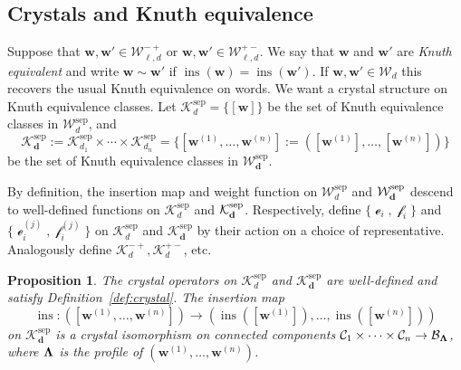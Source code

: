 \documentclass[12pt]{amsart}
\renewcommand{\d}{\mathbf{d}}
\newcommand{\bs}{\boldsymbol}
\DeclareMathOperator{\worde}{{\mathcal e}}
\DeclareMathOperator{\wordf}{{\mathcal f}}
\DeclareMathOperator{\ins}{\operatorname{ins}}
\newtheorem{proposition}[theorem]{Proposition}
\theoremstyle{definition}
\theoremstyle{remark}
\begin{document}
\subsection{Crystals and Knuth equivalence}
Suppose that ${\bs w},{\bs w}' \in {\mathcal W}_{\ell,d}^{-+}$ or ${\bs w},{\bs w}' \in {\mathcal W}_{\ell,d}^{+-}$. We say that 
${\bs w}$ and ${\bs w}'$ are \emph{Knuth equivalent} and write $\bs{w}\sim\bs{w}'$ if $\ins({\bs w}) = \ins({\bs w}')$. 
If ${\bs w},{\bs w}'\in {\mathcal W}_d$ this recovers the usual Knuth equivalence on words.
We want a crystal structure on Knuth equivalence classes. Let 
$\mathcal{K}_d^{\operatorname{sep}}=\{[\bs{w}]\}$ 
be the set of Knuth equivalence classes in $\mathcal{W}_d^{\operatorname{sep}}$, and 
\[\mathcal{K}_{\d}^{\operatorname{sep}} := \mathcal{K}_{d_1}^{\operatorname{sep}}\times\cdots\times 
\mathcal{K}_{d_n}^{\operatorname{sep}}=\{[{\bs w}^{(1)}, \ldots, {\bs w}^{(n)}]:=
([{\bs w}^{(1)}], \ldots, [{\bs w}^{(n)}])\}\]
be the set of Knuth equivalence classes in 
$\mathcal{W}_{\d}^{\operatorname{sep}}$. 

By definition, the insertion map and weight function on ${\mathcal W}_d^{\operatorname{sep}}$ and 
${\mathcal W}_{\bf d}^{\operatorname{sep}}$
descend to well-defined functions on ${\mathcal K}_d^{\operatorname{sep}}$ and 
${\mathcal K}_{\bf d}^{\operatorname{sep}}$. 
Respectively, define $\{\worde_i, \wordf_i\}$ and
$\{\worde_i^{(j)}, \wordf_i^{(j)}\}$ on $\mathcal{K}_d^{\operatorname{sep}}$ and 
$\mathcal{K}_{\d}^{\operatorname{sep}}$ by their action on a
choice of representative. Analogously define ${\mathcal K}_d^{-+}, {\mathcal K}_d^{+-}$, etc.

\begin{proposition}\label{prop:July24abc}
The crystal operators on $\mathcal{K}_d^{\operatorname{sep}}$ and $\mathcal{K}_{\d}^{\operatorname{sep}}$ are well-defined and satisfy Definition~\ref{def:crystal}. The insertion map
\[
\ins: ([{\bs w}^{(1)}, \ldots, {\bs w}^{(n)}]) \to (\ins([{\bs w}^{(1)}]), \ldots,
\ins([{\bs w}^{(n)}]))
\]
on $\mathcal{K}_{\d}^{\operatorname{sep}}$ is a crystal isomorphism on connected components $\mathcal{C}_1\times\cdots\times\mathcal{C}_n\to \mathcal{B}_{\bf \Lambda}$, where ${\bf \Lambda} $ is the profile of $({\bs w}^{(1)}, \ldots, {\bs w}^{(n)})$.
\end{proposition}
\end{document}
